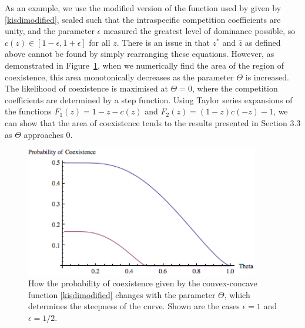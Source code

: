 As an example, we use the modified version of the function used by \cite{kisdi1999evolutionary} given by \eqref{kisdimodified}, scaled such that the intraspecific competition coefficients are unity, and the parameter $\epsilon$ measured the greatest level of dominance possible, so $c(z) \in [1-\epsilon,1+\epsilon]$ for all $z$.  There is an issue in that $z^*$ and $\hat{z}$ as defined above cannot be found by simply rearranging these equations. However, as demonstrated in Figure~\ref{kisdipic}, when we numerically find the area of the region of coexistence, this area monotonically decreases as the parameter $\Theta$ is increased. The likelihood of coexistence is maximised at $\Theta=0$, where the competition coefficients are determined by a step function. Using Taylor series expansions of the functions $F_1(z)=1-z-c(z)$ and $F_2(z)=(1-z)c(-z)-1$, we can show that the area of coexistence tends to the results presented in Section 3.3 as $\Theta$ approaches 0.

\begin{figure}[htbp]
   \centering
   \includegraphics[width=4in]{kisdinum}
   \caption[How the probability of coexistence changes with the slope of the competition kernel at the origin]{How the probability of coexistence given by the convex-concave function \eqref{kisdimodified} changes with the parameter $\Theta$, which determines the steepness of the curve. Shown are the cases $\epsilon=1$ and $\epsilon=1/2$.}
   \label{kisdipic}
\end{figure}
 
